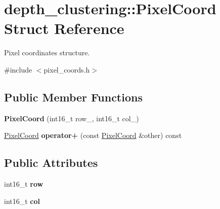 \hypertarget{structdepth__clustering_1_1PixelCoord}{\section{depth\-\_\-clustering\-:\-:Pixel\-Coord Struct Reference}
\label{structdepth__clustering_1_1PixelCoord}
}


Pixel coordinates structure.  




{\ttfamily \#include $<$pixel\-\_\-coords.\-h$>$}

\subsection*{Public Member Functions}
\begin{DoxyCompactItemize}
\item 
\hypertarget{structdepth__clustering_1_1PixelCoord_aff0f4516ef80598fce8f8fc7a2206ac4}{{\bfseries Pixel\-Coord} (int16\-\_\-t row\-\_\-, int16\-\_\-t col\-\_\-)}\label{structdepth__clustering_1_1PixelCoord_aff0f4516ef80598fce8f8fc7a2206ac4}

\item 
\hypertarget{structdepth__clustering_1_1PixelCoord_af661ad9672b6cf28a22d7aa743ed0b5d}{\hyperlink{structdepth__clustering_1_1PixelCoord}{Pixel\-Coord} {\bfseries operator+} (const \hyperlink{structdepth__clustering_1_1PixelCoord}{Pixel\-Coord} \&other) const }\label{structdepth__clustering_1_1PixelCoord_af661ad9672b6cf28a22d7aa743ed0b5d}

\end{DoxyCompactItemize}
\subsection*{Public Attributes}
\begin{DoxyCompactItemize}
\item 
\hypertarget{structdepth__clustering_1_1PixelCoord_ac612119e738debf6a06ded94f3c7daba}{int16\-\_\-t {\bfseries row}}\label{structdepth__clustering_1_1PixelCoord_ac612119e738debf6a06ded94f3c7daba}

\item 
\hypertarget{structdepth__clustering_1_1PixelCoord_ab4311a0fa6c6d0f538ef751e6134498f}{int16\-\_\-t {\bfseries col}}\label{structdepth__clustering_1_1PixelCoord_ab4311a0fa6c6d0f538ef751e6134498f}

\end{DoxyCompactItemize}


